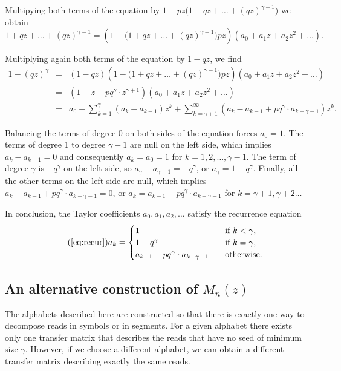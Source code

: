 \documentclass{article}
\begin{document}
Multipying both terms of the equation by $1-pz
\big(1+qz+\ldots+(qz)^{\gamma-1} \big)$ we obtain
\begin{equation*}
1+qz+\ldots+(qz)^{\gamma-1} =
\left(1-\big(1+qz+\ldots+(qz)^{\gamma-1} \big) pz\right)
(a_0 + a_1z +a_2z^2 + \ldots).
\end{equation*}

Multiplying again both terms of the equation by $1-qz$, we find
\begin{eqnarray*}
1-(qz)^\gamma &=& (1-qz) \left(1- \big(1+qz+\ldots+(qz)^{\gamma-1}
\big) pz\right) (a_0 + a_1z +a_2z^2 + \ldots) \\
&=& (1-z+pq^\gamma \cdot z^{\gamma+1}) (a_0 + a_1z +a_2z^2 + \ldots) \\
&=& a_0 + \sum_{k=1}^{\gamma} (a_k-a_{k-1})z^k +
  \sum_{k=\gamma+1}^{\infty} (a_k-a_{k-1}+ pq^\gamma \cdot
a_{k-\gamma-1})z^k.
\end{eqnarray*}

Balancing the terms of degree 0 on both sides of the equation forces $a_0
= 1$. The terms of degree 1 to degree $\gamma-1$ are null on the left
side, which implies $a_k - a_{k-1} = 0$ and consequently $a_k = a_0 = 1$
for $k = 1, 2, \ldots, \gamma-1$. The term of degree $\gamma$ is
$-q^\gamma$ on the left side, so $a_\gamma-a_{\gamma-1} = -q^\gamma$, or
$a_\gamma = 1-q^\gamma$. Finally, all the other terms on the left side
are null, which implies $a_k-a_{k-1}+ pq^\gamma \cdot a_{k-\gamma-1} = 0$,
or $a_k = a_{k-1}-pq^\gamma\cdot a_{k-\gamma-1}$ for $k = \gamma+1,
\gamma+2 \ldots$

In conclusion, the Taylor coefficients $a_0, a_1, a_2, \ldots$ satisfy the
recurrence equation
\begin{equation}
\tag{\ref{eq:recur}}
a_k = 
\begin{cases}
1            &\quad\text{if } k < \gamma, \\
1 -q^\gamma &\quad\text{if } k = \gamma, \\
a_{k-1} -pq^\gamma \cdot a_{k-\gamma-1} &\quad\text{otherwise.}
\end{cases}
\end{equation}

\subsection{An alternative construction of $M_n(z)$}
\label{app_Mn}

The alphabets described here are constructed so that there is exactly one
way to decompose reads in symbols or in segments. For a given alphabet
there exists only one transfer matrix that describes the reads that have
no seed of minimum size $\gamma$. However, if we choose a different
alphabet, we can obtain a different transfer matrix describing exactly the
same reads.
\end{document}
